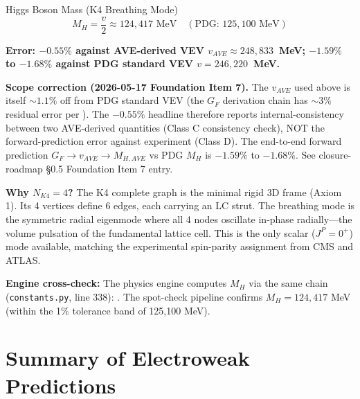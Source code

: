 \begin{resultbox}{Higgs Boson Mass (K4 Breathing Mode)}
\begin{equation}
    \boxed{M_H = \frac{v}{2} \approx 124{,}417 \text{ MeV}}
    \quad (\text{PDG: } 125{,}100 \text{ MeV})
\end{equation}

\textbf{Error: $-0.55\%$ against AVE-derived VEV $v_{AVE} \approx 248{,}833$~MeV; $-1.59\%$ to $-1.68\%$ against PDG standard VEV $v = 246{,}220$~MeV.}

\textbf{Scope correction (2026-05-17 Foundation Item 7).} The $v_{AVE}$ used above is itself $\sim 1.1\%$ off from PDG standard VEV (the $G_F$ derivation chain has $\sim 3\%$ residual error per ). The $-0.55\%$ headline therefore reports internal-consistency between two AVE-derived quantities (Class C consistency check), NOT the forward-prediction error against experiment (Class D). The end-to-end forward prediction $G_F \to v_{AVE} \to M_{H,AVE}$ vs PDG $M_H$ is $-1.59\%$ to $-1.68\%$. See closure-roadmap \S0.5 Foundation Item 7 entry.
\end{resultbox}

\noindent\textbf{Why $N_{K4} = 4$?} The K4 complete graph is the minimal rigid 3D frame (Axiom 1). Its 4 vertices define 6 edges, each carrying an LC strut. The breathing mode is the symmetric radial eigenmode where all 4 nodes oscillate in-phase radially---the volume pulsation of the fundamental lattice cell. This is the only scalar ($J^P = 0^+$) mode available, matching the experimental spin-parity assignment from CMS and ATLAS.

\noindent\textbf{Engine cross-check:} The physics engine computes $M_H$ via the same chain (\texttt{constants.py}, line 338): . The spot-check pipeline confirms $M_H = 124{,}417$ MeV (within the 1\% tolerance band of 125,100 MeV).

\section{Summary of Electroweak Predictions}

